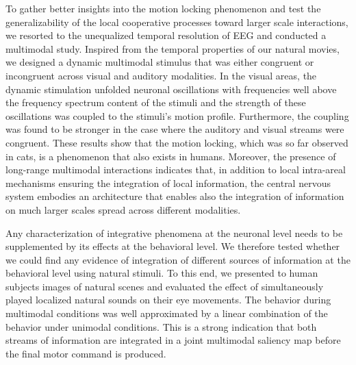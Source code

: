 To gather better insights into the motion locking phenomenon and test the
generalizability of the local cooperative processes toward larger scale
interactions, we resorted to the unequalized temporal resolution of EEG and
conducted a multimodal study. Inspired from the temporal properties of our
natural movies, we designed a dynamic multimodal stimulus that was either
congruent or incongruent across visual and auditory modalities. In the
visual areas, the dynamic stimulation unfolded neuronal oscillations with
frequencies well above the frequency spectrum content of the stimuli and
the strength of these oscillations was coupled to the stimuli's motion
profile. Furthermore, the coupling was found to be stronger in the case
where the auditory and visual streams were congruent. These results show
that the motion locking, which was so far observed in cats, is a phenomenon
that also exists in humans. Moreover, the presence of long-range multimodal
interactions indicates that, in addition to local intra-areal mechanisms
ensuring the integration of local information, the central nervous system
embodies an architecture that enables also the integration of information
on much larger scales spread across different modalities.

Any characterization of integrative phenomena at the neuronal level needs
to be supplemented by its effects at the behavioral level. We therefore
tested whether we could find any evidence of integration of different
sources of information at the behavioral level using natural stimuli. To
this end, we presented to human subjects images of natural scenes and
evaluated the effect of simultaneously played localized natural sounds
on their eye movements. The behavior during multimodal conditions was well
approximated by a linear combination of the behavior under unimodal
conditions. This is a strong indication that both streams of information
are integrated in a joint multimodal saliency map before the final motor
command is produced. 

